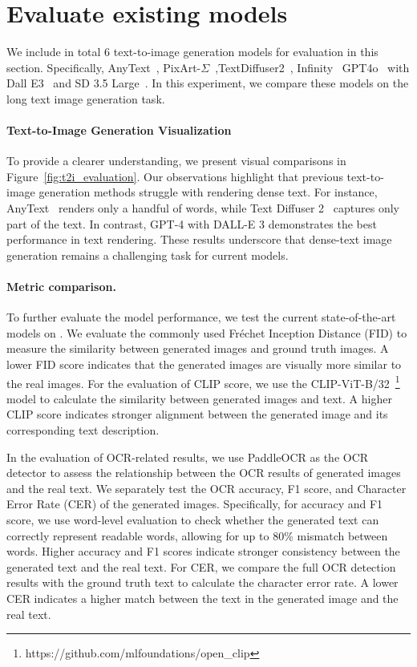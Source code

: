 

\section{Evaluate existing models}

We include in total 6 text-to-image generation models for evaluation in this section.
Specifically, AnyText~\cite{anytext}, 
PixArt-$\Sigma$~\cite{chen2024pixart},TextDiffuser2~\cite{textdiffuser2}, Infinity~\cite{han2024infinity} GPT4o~\cite{gpt4o} with Dall E3~\cite{dalle3} and SD 3.5 Large~\cite{sd3}.
In this experiment, we compare these models on the long text image generation task.

\paragraph{Text-to-Image Generation Visualization}
To provide a clearer understanding, we present visual comparisons in Figure~\ref{fig:t2i_evaluation}.
Our observations highlight that previous text-to-image generation methods struggle with rendering dense text. 
For instance, AnyText~\cite{anytext} renders only a handful of words, while Text Diffuser 2~\cite{textdiffuser2} captures only part of the text.
In contrast, GPT-4 with DALL-E 3 demonstrates the best performance in text rendering. 
These results underscore that dense-text image generation remains a challenging task for current models.

\paragraph{Metric comparison.}
To further evaluate the model performance, we test the current state-of-the-art models on \EvalDatasetName.
We evaluate the commonly used Fréchet Inception Distance (FID) to measure the similarity between generated images and ground truth images. 
A lower FID score indicates that the generated images are visually more similar to the real images.
For the evaluation of CLIP score, we use the CLIP-ViT-B/32~\footnote{https://github.com/mlfoundations/open\_clip} model to calculate the similarity between generated images and text. 
A higher CLIP score indicates stronger alignment between the generated image and its corresponding text description.

In the evaluation of OCR-related results, we use PaddleOCR as the OCR detector to assess the relationship between the OCR results of generated images and the real text. 
We separately test the OCR accuracy, F1 score, and Character Error Rate (CER) of the generated images. Specifically, for accuracy and F1 score, we use word-level evaluation to check whether the generated text can correctly represent readable words, allowing for up to 80\% mismatch between words. 
Higher accuracy and F1 scores indicate stronger consistency between the generated text and the real text. 
For CER, we compare the full OCR detection results with the ground truth text to calculate the character error rate. 
A lower CER indicates a higher match between the text in the generated image and the real text.



